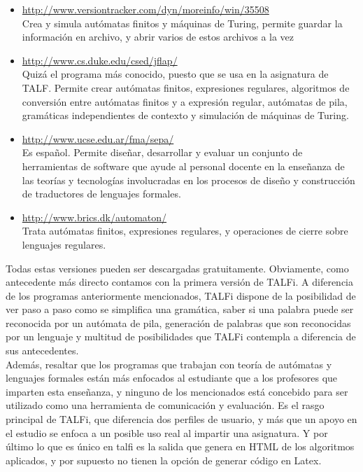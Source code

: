 \documentclass[12pt,a4paper,spanish]{book}
\begin{document}
\begin{itemize}
\item{ \noindent\url{http://www.versiontracker.com/dyn/moreinfo/win/35508} \\}
Crea y simula aut\'omatas finitos y m\'aquinas de Turing, permite guardar la informaci\'on en archivo, y abrir varios de estos archivos a la vez
\end{itemize}
\begin{itemize}
\item{ \url{http://www.cs.duke.edu/csed/jflap/} \\}
Quiz\'a el programa m\'as conocido, puesto que se usa en la asignatura de TALF. Permite crear aut\'omatas finitos, expresiones regulares, algoritmos de conversi\'on entre aut\'omatas finitos y a expresi\'on regular, aut\'omatas de pila, gram\'aticas independientes de contexto y simulaci\'on de m\'aquinas de Turing.
\end{itemize}
\begin{itemize}
\item{ \url{http://www.ucse.edu.ar/fma/sepa/} \\}
Es espa\~{n}ol. Permite dise\~{n}ar, desarrollar y evaluar un conjunto de herramientas de software que ayude al personal docente en la ense\~{n}anza de las teor\'ias y tecnolog\'ias involucradas en los procesos de dise\~{n}o y construcci\'on de traductores de lenguajes formales.
\end{itemize}
\begin{itemize}
\item{ \url{http://www.brics.dk/automaton/} \\}
Trata aut\'omatas finitos, expresiones regulares, y operaciones de cierre sobre lenguajes regulares.
\end{itemize}

Todas estas versiones pueden ser descargadas gratuitamente.
Obviamente, como antecedente m\'as directo contamos con la primera versi\'on de TALFi.
A diferencia de los programas anteriormente mencionados, TALFi dispone de la posibilidad de ver paso a paso como se simplifica una gram\'atica, saber si una palabra puede ser reconocida por un aut\'omata de pila, generaci\'on de palabras que son reconocidas por un lenguaje y multitud de posibilidades que TALFi contempla a diferencia de sus antecedentes.\\
Adem\'as, resaltar que los programas que trabajan con teor\'ia de aut\'omatas y lenguajes formales est\'an m\'as enfocados al estudiante que a los profesores que imparten esta ense\~{n}anza, y ninguno de los mencionados est\'a concebido para ser utilizado como una herramienta de comunicaci\'on y evaluaci\'on. Es el rasgo principal de TALFi, que diferencia dos perfiles de usuario, y m\'as que un apoyo en el estudio se enfoca a un posible uso real al impartir una asignatura. Y por \'ultimo lo que es \'unico en talfi es la salida que genera en HTML de los algoritmos aplicados, y por supuesto no tienen la opci\'on de generar c\'odigo en Latex.
\end{document}
